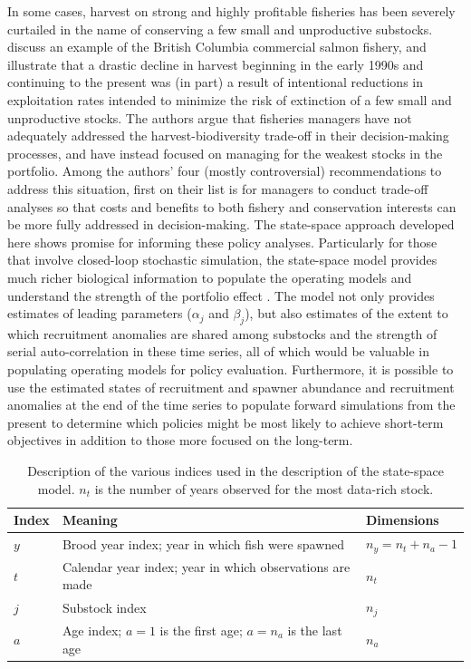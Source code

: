 \documentclass[12pt,]{book}
\theoremstyle{definition}
\theoremstyle{definition}
\theoremstyle{definition}
\theoremstyle{remark}
\begin{document}
In some cases, harvest on strong and highly profitable fisheries has
been severely curtailed in the name of conserving a few small and
unproductive substocks. \citet{walters-etal-2018} discuss an example of
the British Columbia commercial salmon fishery, and illustrate that a
drastic decline in harvest beginning in the early 1990s and continuing
to the present was (in part) a result of intentional reductions in
exploitation rates intended to minimize the risk of extinction of a few
small and unproductive stocks. The authors argue that fisheries managers
have not adequately addressed the harvest-biodiversity trade-off in
their decision-making processes, and have instead focused on managing
for the weakest stocks in the portfolio. Among the authors' four (mostly
controversial) recommendations to address this situation, first on their
list is for managers to conduct trade-off analyses so that costs and
benefits to both fishery and conservation interests can be more fully
addressed in decision-making. The state-space approach developed here
shows promise for informing these policy analyses. Particularly for
those that involve closed-loop stochastic simulation, the state-space
model provides much richer biological information to populate the
operating models and understand the strength of the portfolio effect
\citep[which is inversely related to the magnitude of shared recruitment
trends;][]{schindler-etal-2010, schindler-etal-2015}. The model not only
provides estimates of leading parameters (\(\alpha_j\) and \(\beta_j\)),
but also estimates of the extent to which recruitment anomalies are
shared among substocks and the strength of serial auto-correlation in
these time series, all of which would be valuable in populating
operating models for policy evaluation. Furthermore, it is possible to
use the estimated states of recruitment and spawner abundance and
recruitment anomalies at the end of the time series to populate forward
simulations from the present to determine which policies might be most
likely to achieve short-term objectives in addition to those more
focused on the long-term.

\clearpage

\singlespacing

\begin{table}

\caption{\label{tab:ch4-notation-table}Description of the various indices used in the description of the state-space model. $n_t$ is the number of years observed for the most data-rich stock.}
\centering
\begin{tabular}[t]{l>{\raggedright\arraybackslash}p{25em}>{\raggedright\arraybackslash}p{10em}}
\toprule
\textbf{Index} & \textbf{Meaning} & \textbf{Dimensions}\\
\midrule
$y$ & Brood year index; year in which fish were spawned & $n_y=n_t + n_a - 1$\\
$t$ & Calendar year index; year in which observations are made & $n_t$\\
$j$ & Substock index & $n_j$\\
$a$ & Age index; $a=1$ is the first age; $a=n_a$ is the last age & $n_a$\\
\bottomrule
\end{tabular}
\end{table}
\end{document}
